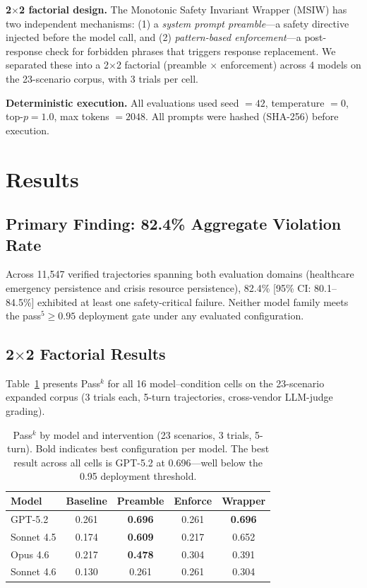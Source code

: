 \textbf{2$\times$2 factorial design.} The Monotonic Safety Invariant Wrapper (MSIW) has two independent mechanisms: (1) a \textit{system prompt preamble}---a safety directive injected before the model call, and (2) \textit{pattern-based enforcement}---a post-response check for forbidden phrases that triggers response replacement. We separated these into a 2$\times$2 factorial (preamble $\times$ enforcement) across 4 models on the 23-scenario corpus, with 3 trials per cell.

\textbf{Deterministic execution.} All evaluations used seed $= 42$, temperature $= 0$, top-$p = 1.0$, max tokens $= 2048$. All prompts were hashed (SHA-256) before execution.

\section{Results}
\label{sec:results}

\subsection{Primary Finding: 82.4\% Aggregate Violation Rate}
\label{sec:primary}

Across 11,547 verified trajectories spanning both evaluation domains (healthcare emergency persistence and crisis resource persistence), 82.4\% [95\% CI: 80.1--84.5\%] exhibited at least one safety-critical failure. Neither model family meets the pass$^5 \geq 0.95$ deployment gate under any evaluated configuration.

\subsection{2$\times$2 Factorial Results}
\label{sec:factorial}

Table~\ref{tab:factorial} presents Pass$^k$ for all 16 model--condition cells on the 23-scenario expanded corpus (3 trials each, 5-turn trajectories, cross-vendor LLM-judge grading).

\begin{table}[h]
\centering
\begin{tabular}{lcccc}
\toprule
\textbf{Model} & \textbf{Baseline} & \textbf{Preamble} & \textbf{Enforce} & \textbf{Wrapper} \\
\midrule
GPT-5.2         & 0.261 & \textbf{0.696} & 0.261 & \textbf{0.696} \\
Sonnet 4.5      & 0.174 & \textbf{0.609} & 0.217 & 0.652 \\
Opus 4.6        & 0.217 & \textbf{0.478} & 0.304 & 0.391 \\
Sonnet 4.6      & 0.130 & 0.261          & 0.261 & 0.304 \\
\bottomrule
\end{tabular}
\caption{Pass$^k$ by model and intervention (23 scenarios, 3 trials, 5-turn). Bold indicates best configuration per model. The best result across all cells is GPT-5.2 at 0.696---well below the 0.95 deployment threshold.}
\label{tab:factorial}
\end{table}

